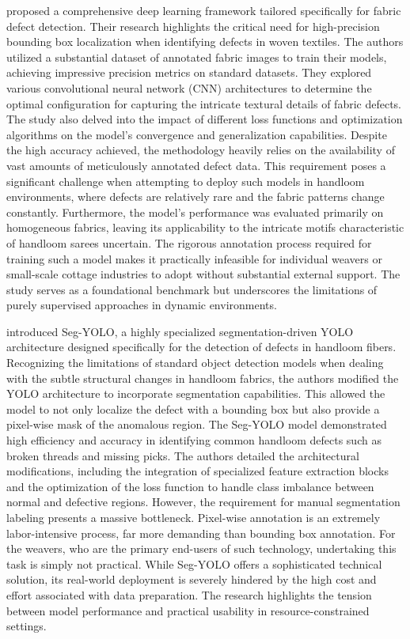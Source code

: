 \documentclass{ieeeaccess}
\begin{document}
\cite{b1} proposed a comprehensive deep learning framework tailored specifically for fabric defect detection. Their research highlights the critical need for high-precision bounding box localization when identifying defects in woven textiles. The authors utilized a substantial dataset of annotated fabric images to train their models, achieving impressive precision metrics on standard datasets. They explored various convolutional neural network (CNN) architectures to determine the optimal configuration for capturing the intricate textural details of fabric defects. The study also delved into the impact of different loss functions and optimization algorithms on the model's convergence and generalization capabilities. Despite the high accuracy achieved, the methodology heavily relies on the availability of vast amounts of meticulously annotated defect data. This requirement poses a significant challenge when attempting to deploy such models in handloom environments, where defects are relatively rare and the fabric patterns change constantly. Furthermore, the model's performance was evaluated primarily on homogeneous fabrics, leaving its applicability to the intricate motifs characteristic of handloom sarees uncertain. The rigorous annotation process required for training such a model makes it practically infeasible for individual weavers or small-scale cottage industries to adopt without substantial external support. The study serves as a foundational benchmark but underscores the limitations of purely supervised approaches in dynamic environments.

\cite{b2} introduced Seg-YOLO, a highly specialized segmentation-driven YOLO architecture designed specifically for the detection of defects in handloom fibers. Recognizing the limitations of standard object detection models when dealing with the subtle structural changes in handloom fabrics, the authors modified the YOLO architecture to incorporate segmentation capabilities. This allowed the model to not only localize the defect with a bounding box but also provide a pixel-wise mask of the anomalous region. The Seg-YOLO model demonstrated high efficiency and accuracy in identifying common handloom defects such as broken threads and missing picks. The authors detailed the architectural modifications, including the integration of specialized feature extraction blocks and the optimization of the loss function to handle class imbalance between normal and defective regions. However, the requirement for manual segmentation labeling presents a massive bottleneck. Pixel-wise annotation is an extremely labor-intensive process, far more demanding than bounding box annotation. For the weavers, who are the primary end-users of such technology, undertaking this task is simply not practical. While Seg-YOLO offers a sophisticated technical solution, its real-world deployment is severely hindered by the high cost and effort associated with data preparation. The research highlights the tension between model performance and practical usability in resource-constrained settings.
\end{document}
